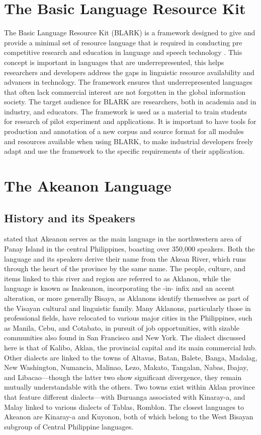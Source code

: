 \section{The Basic Language Resource Kit}
\label{sec: BLARK}
The Basic Language Resource Kit (BLARK) is a framework designed to give and provide a minimal set of resource language that is required in conducting pre competitive research and education in language and speech technology . This concept is important in languages that are underrepresented, this helps researchers and developers address the gaps in linguistic resource availability and advances in technology. The framework ensures that underrepresented languages that often lack commercial interest are not forgotten in the global information society. 
The target audience for BLARK are researchers, both in academia and in industry, and educators. The framework is used as a material to train students for research of pilot experiment and applications. It is important to have tools for production and annotation of a new corpus and source format for all modules and resources available when using BLARK, to make industrial developers freely adapt and use the framework to the specific requirements of their application.

\section{The Akeanon Language}
\label{sec:AkeanonLanguage}
\subsection{History and its Speakers}
 stated that Akeanon serves as the main language in the northwestern area of Panay Island in the central Philippines, boasting over 350,000 speakers. Both the language and its speakers derive their name from the Akean River, which runs through the heart of the province by the same name. The people, culture, and items linked to this river and region are referred to as Aklanon, while the language is known as Inakeanon, incorporating the -in- infix and an accent alteration, or more generally Bisaya, as Aklanons identify themselves as part of the Visayan cultural and linguistic family. Many Aklanons, particularly those in professional fields, have relocated to various major cities in the Philippines, such as Manila, Cebu, and Cotabato, in pursuit of job opportunities, with sizable communities also found in San Francisco and New York. The dialect discussed here is that of Kalibo, Aklan, the provincial capital and its main commercial hub. Other dialects are linked to the towns of Altavas, Batan, Balete, Banga, Madalag, New Washington, Numancia, Malinao, Lezo, Makato, Tangalan, Nabas, Ibajay, and Libacao—though the latter two show significant divergence, they remain mutually understandable with the others. Two towns exist within Aklan province that feature different dialects—with Buruanga associated with Kinaray-a, and Malay linked to various dialects of Tablas, Romblon. The closest languages to Akeanon are Kinaray-a and Kuyonon, both of which belong to the West Bisayan subgroup of Central Philippine languages.

